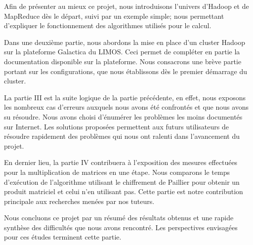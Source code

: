 \bigskip
Afin de présenter au mieux ce projet, nous introduisons l'univers d'Hadoop et de MapReduce dès le départ, suivi par un exemple simple; nous permettant d'expliquer le fonctionnement des algorithmes utilisés pour le calcul.\par
Dans une deuxième partie, nous abordons la mise en place d'un cluster Hadoop sur la plateforme Galactica du LIMOS. Ceci permet de compléter en partie la documentation disponible sur la plateforme. Nous consacrons une brève partie portant sur les configurations, que nous établissons dès le premier démarrage du cluster.\par 
La partie III est la suite logique de la partie précédente, en effet, nous exposons les nombreux cas d'erreurs auxquels nous avons été confrontés et que nous avons su résoudre. Nous avons choisi d'énumérer les problèmes les moins documentés sur Internet. Les solutions proposées permettent aux futurs utilisateurs de résoudre rapidement des problèmes qui nous ont ralenti dans l'avancement du projet.\par
En dernier lieu, la partie IV contribuera à l'exposition des mesures effectuées pour la multiplication de matrices en une étape. Nous comparons le temps d'exécution de l'algorithme utilisant le chiffrement de Paillier pour obtenir un produit matriciel et celui n'en utilisant pas. Cette partie est notre contribution principale aux recherches menées par nos tuteurs.\par
Nous concluons ce projet par un résumé des résultats obtenus et une rapide synthèse des difficultés que nous avons rencontré. Les perspectives envisagées pour ces études terminent cette partie.
